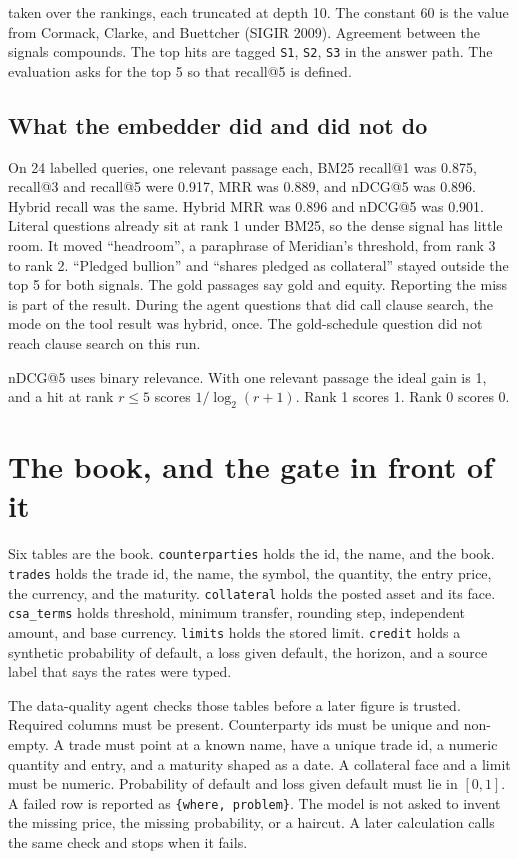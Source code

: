 \documentclass[11pt,a4paper]{article}
\begin{document}
taken over the rankings, each truncated at depth 10. The constant 60 is the value from Cormack, Clarke, and Buettcher (SIGIR 2009). Agreement between the signals compounds. The top hits are tagged \texttt{S1}, \texttt{S2}, \texttt{S3} in the answer path. The evaluation asks for the top 5 so that recall@5 is defined.

\subsection{What the embedder did and did not do}

On 24 labelled queries, one relevant passage each, BM25 recall@1 was 0.875, recall@3 and recall@5 were 0.917, MRR was 0.889, and nDCG@5 was 0.896. Hybrid recall was the same. Hybrid MRR was 0.896 and nDCG@5 was 0.901. Literal questions already sit at rank 1 under BM25, so the dense signal has little room. It moved ``headroom'', a paraphrase of Meridian's threshold, from rank 3 to rank 2. ``Pledged bullion'' and ``shares pledged as collateral'' stayed outside the top 5 for both signals. The gold passages say gold and equity. Reporting the miss is part of the result. During the agent questions that did call clause search, the mode on the tool result was hybrid, once. The gold-schedule question did not reach clause search on this run.

nDCG@5 uses binary relevance. With one relevant passage the ideal gain is 1, and a hit at rank $r\le 5$ scores $1/\log_2(r+1)$. Rank 1 scores 1. Rank 0 scores 0.

\section{The book, and the gate in front of it}

Six tables are the book. \texttt{counterparties} holds the id, the name, and the book. \texttt{trades} holds the trade id, the name, the symbol, the quantity, the entry price, the currency, and the maturity. \texttt{collateral} holds the posted asset and its face. \texttt{csa\_terms} holds threshold, minimum transfer, rounding step, independent amount, and base currency. \texttt{limits} holds the stored limit. \texttt{credit} holds a synthetic probability of default, a loss given default, the horizon, and a source label that says the rates were typed.

The data-quality agent checks those tables before a later figure is trusted. Required columns must be present. Counterparty ids must be unique and non-empty. A trade must point at a known name, have a unique trade id, a numeric quantity and entry, and a maturity shaped as a date. A collateral face and a limit must be numeric. Probability of default and loss given default must lie in $[0,1]$. A failed row is reported as \texttt{\{where, problem\}}. The model is not asked to invent the missing price, the missing probability, or a haircut. A later calculation calls the same check and stops when it fails.
\end{document}
